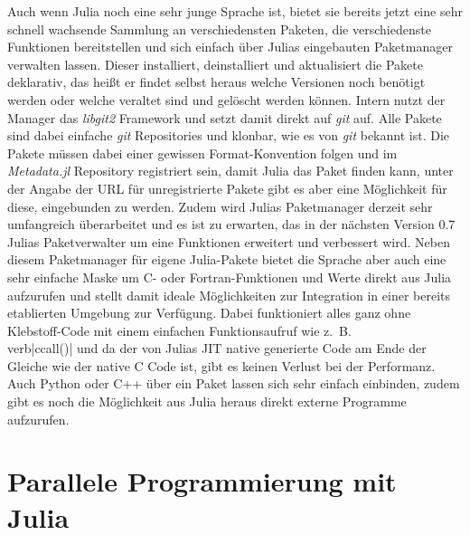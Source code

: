 \documentclass[proseminar,german,utf8]{zihpub}
\begin{document}
Auch wenn Julia noch eine sehr junge Sprache ist, bietet sie bereits jetzt eine sehr schnell wachsende Sammlung an verschiedensten Paketen, die verschiedenste Funktionen bereitstellen und sich einfach über Julias eingebauten Paketmanager verwalten lassen. Dieser installiert, deinstalliert und aktualisiert die Pakete deklarativ, das heißt er findet selbst heraus welche Versionen noch benötigt werden oder welche veraltet sind und gelöscht werden können. Intern nutzt der Manager das \textit{libgit2} Framework und setzt damit direkt auf \textit{git} auf. Alle Pakete sind dabei einfache \textit{git} Repositories und klonbar, wie es von \textit{git} bekannt ist. Die Pakete müssen dabei einer gewissen Format-Konvention folgen und im \textit{Metadata.jl} Repository registriert sein, damit Julia das Paket finden kann, unter der Angabe der URL für unregistrierte Pakete gibt es aber eine Möglichkeit für diese, eingebunden zu werden. Zudem wird Julias Paketmanager derzeit sehr umfangreich überarbeitet und es ist zu erwarten, das in der nächsten Version 0.7 Julias Paketverwalter um eine Funktionen erweitert und verbessert wird. Neben diesem Paketmanager für eigene Julia-Pakete bietet die Sprache aber auch eine sehr einfache Maske um C- oder Fortran-Funktionen und Werte direkt aus Julia aufzurufen und stellt damit ideale Möglichkeiten zur Integration in einer bereits etablierten Umgebung zur Verfügung. Dabei funktioniert alles ganz ohne Klebstoff-Code mit einem einfachen Funktionsaufruf wie z.~B. \\verb|ccall()| und da der von Julias JIT native generierte Code am Ende der Gleiche wie der native C Code ist, gibt es keinen Verlust bei der Performanz. Auch Python oder C++ über ein Paket lassen sich sehr einfach einbinden, zudem gibt es noch die Möglichkeit aus Julia heraus direkt externe Programme aufzurufen.

\section{Parallele Programmierung mit Julia}
\end{document}
